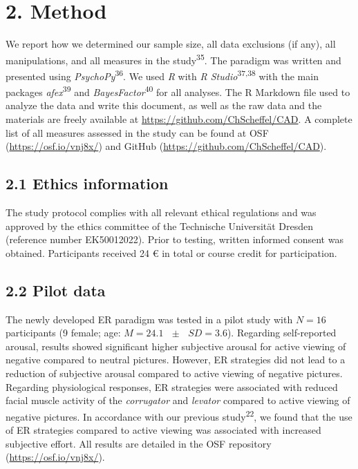 \documentclass[
  man,floatsintext]{apa6}
\begin{document}
\hypertarget{method}{%
\section{2. Method}\label{method}}

We report how we determined our sample size, all data exclusions (if any), all manipulations, and all measures in the study\textsuperscript{35}.
The paradigm was written and presented using \emph{PsychoPy}\textsuperscript{36}.
We used \emph{R} with \emph{R Studio}\textsuperscript{37,38} with the main packages \emph{afex}\textsuperscript{39} and \emph{BayesFactor}\textsuperscript{40} for all analyses.
The R Markdown file used to analyze the data and write this document, as well as the raw data and the materials are freely available at \url{https://github.com/ChScheffel/CAD}.
A complete list of all measures assessed in the study can be found at OSF (\url{https://osf.io/vnj8x/}) and GitHub (\url{https://github.com/ChScheffel/CAD}).

\hypertarget{ethics-information}{%
\subsection{2.1 Ethics information}\label{ethics-information}}

The study protocol complies with all relevant ethical regulations and was approved by the ethics committee of the Technische Universität Dresden (reference number EK50012022).
Prior to testing, written informed consent was obtained.
Participants received 24 € in total or course credit for participation.

\hypertarget{pilot-data}{%
\subsection{2.2 Pilot data}\label{pilot-data}}

The newly developed ER paradigm was tested in a pilot study with \(N=16\) participants (9 female; age: \(M = 24.1\text{ }\pm\text{ }SD = 3.6\)).
Regarding self-reported arousal, results showed significant higher subjective arousal for active viewing of negative compared to neutral pictures.
However, ER strategies did not lead to a reduction of subjective arousal compared to active viewing of negative pictures.
Regarding physiological responses, ER strategies were associated with reduced facial muscle activity of the \emph{corrugator} and \emph{levator} compared to active viewing of negative pictures.
In accordance with our previous study\textsuperscript{22}, we found that the use of ER strategies compared to active viewing was associated with increased subjective effort.
All results are detailed in the OSF repository (\url{https://osf.io/vnj8x/}).
\end{document}
